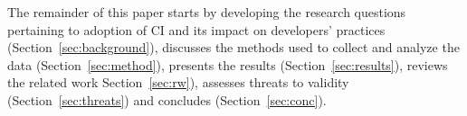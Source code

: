 The remainder of this paper starts by developing the research questions pertaining to adoption of CI and its impact
 on developers' practices (Section~\ref{sec:background}), discusses the methods used to collect and analyze 
 the data (Section~\ref{sec:method}), presents the results (Section~\ref{sec:results}), reviews the related 
 work Section~\ref{sec:rw}), assesses threats to validity (Section~\ref{sec:threats}) and concludes 
 (Section~\ref{sec:conc}).






